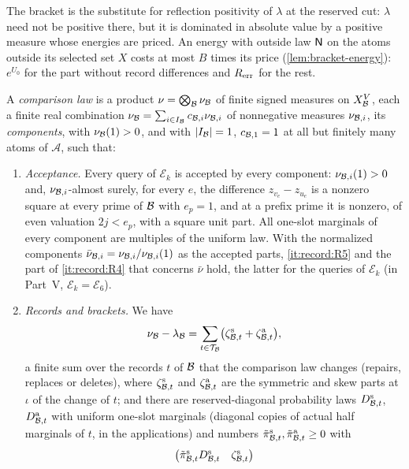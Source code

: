 The bracket is the substitute for reflection positivity of $\lambda$ at the
reserved cut: $\lambda$ need not be positive there, but it is dominated in
absolute value by a positive measure whose energies are priced. An energy
with outside law $\mathsf N$ on the atoms outside its selected set $X$ costs at
most $B$ times its price (\cref{lem:bracket-energy}): $e^{U_0}$ for the
part without record differences and $R_{\rm err}$ for the rest.

\begin{definition}\label{def:record:comparison-law}
\label{def:cp4}
A \emph{comparison law} is a product $\nu=\bigotimes_{\mathcal B}\nu_{\mathcal B}$ of
finite signed measures on $X_{\mathcal B}^V$, each a finite real combination
$\nu_{\mathcal B}=\sum_{i\in I_\mathcal B}c_{\mathcal B,i}\nu_{\mathcal B,i}$ of nonnegative measures
$\nu_{\mathcal B,i}$, its \emph{components}, with $\nu_\mathcal B(1)>0$, and with
$|I_\mathcal B|=1$, $c_{\mathcal B,1}=1$ at all but finitely many atoms of $\mathcal A$,
such that:
\begin{enumerate}[label=(\alph*)]
\item\emph{Acceptance.} Every query of $\mathcal E_k$ is accepted by every
 component: $\nu_{\mathcal B,i}(1)>0$ and, $\nu_{\mathcal B,i}$-almost surely, for every
 $e$, the difference $z_{v_e}-z_{u_e}$ is a nonzero square at every prime of
 $\mathcal B$ with $e_p=1$, and at a prefix prime it is nonzero, of even valuation
 $2j<e_p$, with a square unit part. All one-slot marginals of every component
 are multiples of the uniform law. With the normalized components
 $\bar\nu_{\mathcal B,i}=\nu_{\mathcal B,i}/\nu_{\mathcal B,i}(1)$ as the accepted parts,
 \ref{it:record:R5} and the part of \ref{it:record:R4} that concerns
 $\bar\nu$ hold, the latter for the queries of $\mathcal E_k$ (in Part~V,
 $\mathcal E_k=\mathcal E_6$).
\item\emph{Records and brackets.} We have
 \[
  \nu_{\mathcal B}-\lambda_{\mathcal B}=\sum_{t\in\mathcal T_{\mathcal B}}
  \bigl(\zeta^{\rm s}_{\mathcal B,t}+\zeta^{\rm a}_{\mathcal B,t}\bigr),
 \]
 a finite sum over the records $t$ of $\mathcal B$ that the comparison law changes
 (repairs, replaces or deletes), where $\zeta^{\rm s}_{\mathcal B,t}$ and
 $\zeta^{\rm a}_{\mathcal B,t}$ are the symmetric and skew parts at $\iota$ of the
 change of $t$; and there are reserved-diagonal probability laws
 $D^{\rm s}_{\mathcal B,t}$, $D^{\rm a}_{\mathcal B,t}$ with uniform one-slot marginals
 (diagonal copies of actual half marginals of $t$, in the applications) and
 numbers $\tilde\pi^{\rm s}_{\mathcal B,t},\tilde\pi^{\rm a}_{\mathcal B,t}\ge0$ with
 \[
  \begin{pmatrix}\tilde\pi^{\rm s}_{\mathcal B,t}D^{\rm s}_{\mathcal B,t}&\zeta^{\rm s}_{\mathcal B,t}\\

\end{pmatrix}\]
\end{enumerate}
\end{definition}
